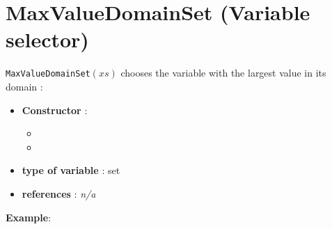 \section{MaxValueDomainSet (Variable selector)}\label{maxvaldomainset:maxvaldomainsetvarselector}\hypertarget{maxvaldomainset:maxvaldomainsetvarselector}{}
\begin{notedef}
  \texttt{MaxValueDomainSet}$(xs)$ chooses the variable with the largest value in its domain :
\end{notedef}

\begin{itemize}
	\item \textbf{Constructor} : 
	\begin{itemize}
	\item {}
	\item {}
	\end{itemize}	
	\item \textbf{type of variable} : set
	\item \textbf{references} : \emph{n/a}
\end{itemize}

\textbf{Example}:
%

